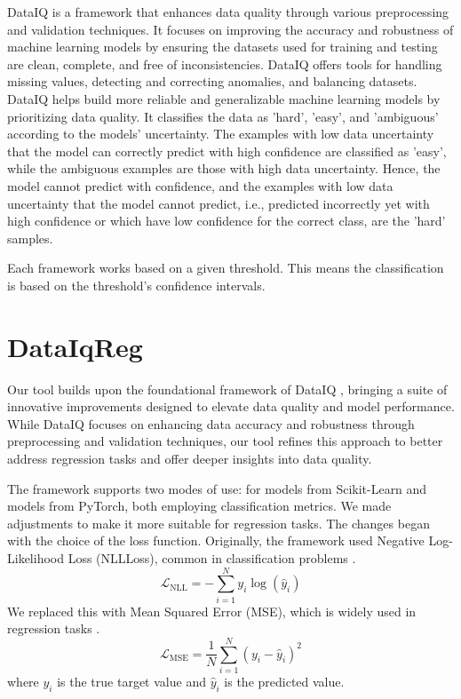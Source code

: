 \documentclass{article}
\theoremstyle{plain}
\theoremstyle{definition}
\theoremstyle{remark}
\begin{document}
DataIQ \cite{unknown} is a framework that enhances data quality through various preprocessing and validation techniques. It focuses on improving the accuracy and robustness of machine learning models by ensuring the datasets used for training and testing are clean, complete, and free of inconsistencies. DataIQ offers tools for handling missing values, detecting and correcting anomalies, and balancing datasets. DataIQ helps build more reliable and generalizable machine learning models by prioritizing data quality. It classifies the data as 'hard', 'easy', and 'ambiguous' according to the models' uncertainty.
The examples with low data uncertainty that the model can correctly predict with high confidence are classified as 'easy', while the ambiguous examples are those with high data uncertainty. Hence, the model cannot predict with confidence, and the examples with low data uncertainty that the model cannot predict, i.e., predicted incorrectly yet with high confidence or which have low confidence for the correct class, are the 'hard' samples. 

Each framework works based on a given threshold. This means the classification is based on the threshold's confidence intervals. 

\section{DataIqReg}
Our tool builds upon the foundational framework of DataIQ \cite{unknown}, bringing a suite of innovative improvements designed to elevate data quality and model performance. While DataIQ focuses on enhancing data accuracy and robustness through preprocessing and validation techniques, our tool refines this approach to better address regression tasks and offer deeper insights into data quality. 

The framework supports two modes of use: for models from Scikit-Learn and models from PyTorch, both employing classification metrics. We made adjustments to make it more suitable for regression tasks. The changes began with the choice of the loss function. Originally, the framework used Negative Log-Likelihood Loss (NLLLoss), common in classification problems \cite{pytorchNLLLoss}. 
\[
\mathcal{L}_{\text{NLL}} = -\sum_{i=1}^{N} y_i \log(\hat{y}_i)
\]
We replaced this with Mean Squared Error (MSE), which is widely used in regression tasks \cite{pytorchMSELoss}.
\[
\mathcal{L}_{\text{MSE}} = \frac{1}{N} \sum_{i=1}^{N} \left( y_i - \hat{y}_i \right)^2
\]
where \( y_i \) is the true target value and \( \hat{y}_i \) is the predicted value.
\end{document}
